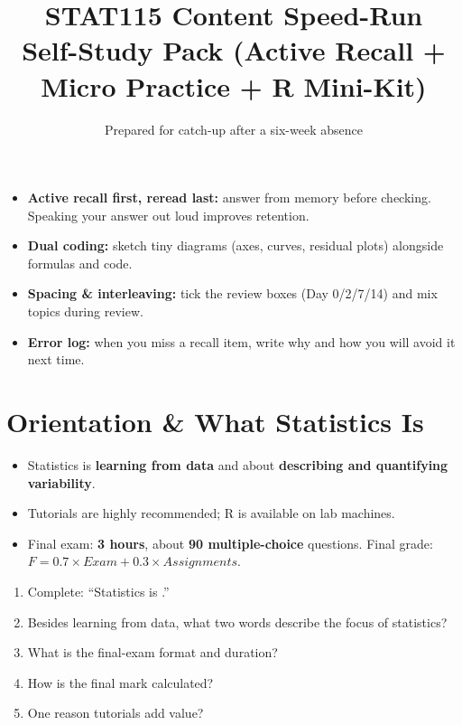 \documentclass[11pt,a4paper]{article}
\title{\vspace{-1.5em}\textbf{STAT115 Content Speed-Run}\\
\large Self-Study Pack (Active Recall + Micro Practice + R Mini-Kit)}
\author{Prepared for catch-up after a six-week absence}
\date{}
\begin{document}
\maketitle

\begin{tcolorbox}[colback=SoftBg,colframe=Accent!40!black,breakable,boxrule=0.5pt,arc=2mm,title=\textbf{How to use this pack (learning-science built-in)}]
\begin{itemize}
  \item \textbf{Active recall first, reread last:} answer from memory before checking. Speaking your answer out loud improves retention.
  \item \textbf{Dual coding:} sketch tiny diagrams (axes, curves, residual plots) alongside formulas and code.
  \item \textbf{Spacing \& interleaving:} tick the review boxes (Day 0/2/7/14) and mix topics during review.
  \item \textbf{Error log:} when you miss a recall item, write why and how you will avoid it next time.
\end{itemize}
\end{tcolorbox}

\tableofcontents
\newpage

\section{Orientation \& What Statistics Is}

\begin{corebox}
\begin{itemize}
  \item Statistics is \textbf{learning from data} and about \textbf{describing and quantifying variability}.
  \item Tutorials are highly recommended; R is available on lab machines.
  \item Final exam: \textbf{3 hours}, about \textbf{90 multiple-choice} questions. Final grade: \(F = 0.7\times Exam + 0.3\times Assignments\).
\end{itemize}
\end{corebox}

\begin{recallbox}
\begin{enumerate}
  \item Complete: ``Statistics is \underline{\hspace{4cm}}.''
  \item Besides learning from data, what two words describe the focus of statistics?
  \item What is the final-exam format and duration?
  \item How is the final mark calculated?
  \item One reason tutorials add value?
\end{enumerate}
\end{recallbox}
\end{document}
